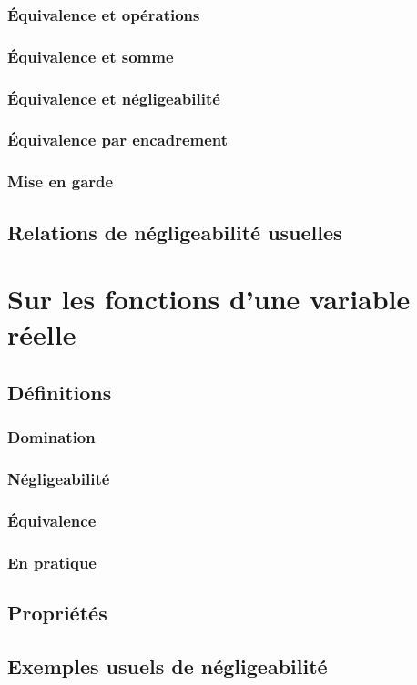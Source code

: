 \documentclass[12pt,a4paper,french]{book}
\begin{document}
			\subsubsection{Équivalence et opérations}
			\subsubsection{Équivalence et somme}
			\subsubsection{Équivalence et négligeabilité}
			\subsubsection{Équivalence par encadrement}
			\subsubsection{Mise en garde}
		\subsection{Relations de négligeabilité usuelles}
	\section{Sur les fonctions d'une variable réelle}
		\subsection{Définitions}
			\subsubsection{Domination}
			\subsubsection{Négligeabilité}
			\subsubsection{Équivalence}
			\subsubsection{En pratique}
		\subsection{Propriétés}
		\subsection{Exemples usuels de négligeabilité}
\end{document}
